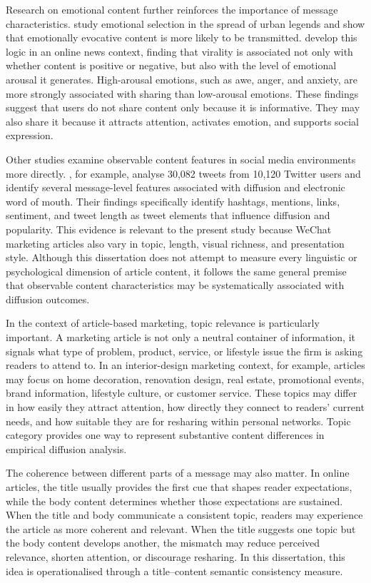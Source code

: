 Research on emotional content further reinforces the importance of message characteristics. \textcite{heath2001} study emotional selection in the spread of urban legends and show that emotionally evocative content is more likely to be transmitted. \textcite{bergermilkman2012} develop this logic in an online news context, finding that virality is associated not only with whether content is positive or negative, but also with the level of emotional arousal it generates. High-arousal emotions, such as awe, anger, and anxiety, are more strongly associated with sharing than low-arousal emotions. These findings suggest that users do not share content only because it is informative. They may also share it because it attracts attention, activates emotion, and supports social expression.

Other studies examine observable content features in social media environments more directly. \textcite{lahuertaotero2018}, for example, analyse 30,082 tweets from 10,120 Twitter users and identify several message-level features associated with diffusion and electronic word of mouth. Their findings specifically identify hashtags, mentions, links, sentiment, and tweet length as tweet elements that influence diffusion and popularity. This evidence is relevant to the present study because WeChat marketing articles also vary in topic, length, visual richness, and presentation style. Although this dissertation does not attempt to measure every linguistic or psychological dimension of article content, it follows the same general premise that observable content characteristics may be systematically associated with diffusion outcomes.

In the context of article-based marketing, topic relevance is particularly important. A marketing article is not only a neutral container of information, it signals what type of problem, product, service, or lifestyle issue the firm is asking readers to attend to. In an interior-design marketing context, for example, articles may focus on home decoration, renovation design, real estate, promotional events, brand information, lifestyle culture, or customer service. These topics may differ in how easily they attract attention, how directly they connect to readers' current needs, and how suitable they are for resharing within personal networks. Topic category provides one way to represent substantive content differences in empirical diffusion analysis.

The coherence between different parts of a message may also matter. In online articles, the title usually provides the first cue that shapes reader expectations, while the body content determines whether those expectations are sustained. When the title and body communicate a consistent topic, readers may experience the article as more coherent and relevant. When the title suggests one topic but the body content develops another, the mismatch may reduce perceived relevance, shorten attention, or discourage resharing. In this dissertation, this idea is operationalised through a title–content semantic consistency measure.

